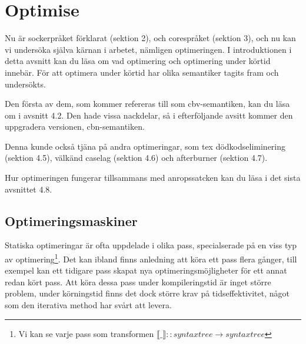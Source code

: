 \documentclass[Rapport]{subfiles}
\begin{document}
\section{Optimise}


Nu är sockerpråket förklarat (sektion 2), och corespråket (sektion 3),
och nu kan vi undersöka själva kärnan i arbetet, nämligen optimeringen.
I introduktionen i detta avsnitt kan du läsa om vad optimering och 
optimering under körtid innebär. För att optimera under körtid har 
olika semantiker tagits fram och undersökts.
    
Den första av dem, som kommer refereras till som cbv-semantiken, 
kan du läsa om i avsnitt 4.2. Den hade vissa nackdelar, så i 
efterföljande avsitt kommer den uppgradera versionen, cbn-semantiken.

Denna kunde också tjäna på andra optimeringar, som tex
dödkodseliminering (sektion 4.5), 
välkänd caselag (sektion 4.6) och 
afterburner (sektion 4.7).

Hur optimeringen fungerar tillsammans med anropssatcken
kan du läsa i det sista avsnittet 4.8.





\subsection{Optimeringsmaskiner}

Statiska optimeringar är ofta uppdelade i olika pass, specialserade på en viss
typ av optimering\footnote{Vi kan se varje pass som transformen $\llbracket \_ \rrbracket :: syntaxtree \rightarrow syntaxtree$}. Det kan ibland finns anledning att köra ett pass flera gånger, till exempel kan ett tidigare pass skapat nya optimeringsmöjligheter för ett annat redan kört pass. Att köra dessa pass under kompileringstid är inget större problem, under körningstid finns det dock större krav på tidseffektivitet, något som den iterativa 
method har svårt att levera.
\end{document}
